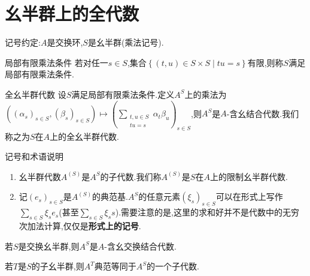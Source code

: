\section{幺半群上的全代数}

记号约定:$A$是交换环,$S$是幺半群(乘法记号).

\begin{definition}{局部有限乘法条件}{}
	若对任一$s\in S$,集合$\left\{\left(t,u\right)\in S\times S\middle|tu=s\right\}$有限,则称$S$满足局部有限乘法条件.
\end{definition}

\begin{definition}{全幺半群代数}{}
	设$S$满足局部有限乘法条件.定义$A^{S}$上的乘法为$\left(\left(\alpha_{s}\right)_{s\in S},\left(\beta_{s}\right)_{s\in S}\right)\mapsto\left(\sum\limits_{\substack{t,u\in S\\tu=s}}\alpha_{t}\beta_{u}\right)_{s\in S}$,则$A^{S}$是$A$-含幺结合代数.我们称之为$S$在$A$上的全幺半群代数.
\end{definition}

\begin{remark}{记号和术语说明}{}
	\begin{enumerate}
		\item 幺半群代数$A^{\left(S\right)}$是$A^{S}$的子代数.我们称$A^{\left(S\right)}$是$S$在$A$上的限制幺半群代数.
		\item 记$\left(e_{s}\right)_{s\in S}$是$A^{\left(S\right)}$的典范基.$A^{S}$的任意元素$\left(\xi_{s}\right)_{s\in S}$可以在形式上写作$\sum\limits_{s\in S}\xi_{s}e_{s}$(甚至$\sum\limits_{s\in S}\xi_{s}s$).需要注意的是,这里的求和好并不是代数中的无穷次加法计算,仅仅是\textbf{形式上的记号}.
	\end{enumerate}
\end{remark}

\begin{proposition}{}{}
	若$S$是交换幺半群,则$A^{S}$是$A$-含幺交换结合代数.
\end{proposition}

\begin{proposition}{}{}
	若$T$是$S$的子幺半群,则$A^{T}$典范等同于$A^{S}$的一个子代数.
\end{proposition}

